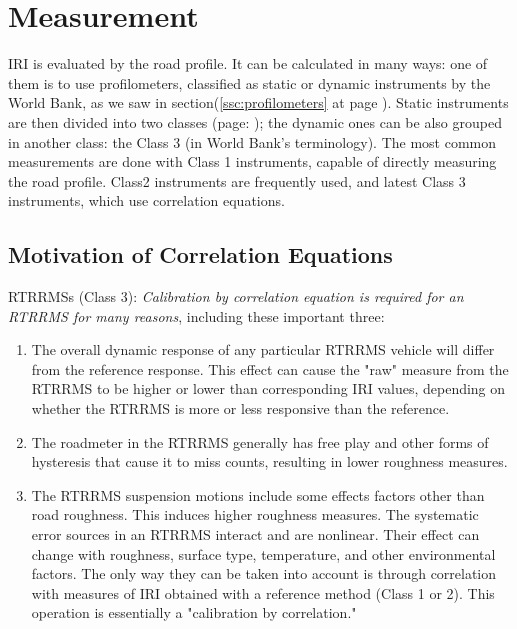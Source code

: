 \documentclass[tesi]{subfiles}
\begin{document}
\section{Measurement}\label{Measurement of IRI}
IRI is evaluated by the road profile. It can be calculated in many ways: one of them is to use profilometers, classified as static or dynamic instruments by the World Bank, as we saw in section(\ref{ssc:profilometers} at page \pageref{ssc:profilometers}). Static instruments are then divided into two classes (page: \pageref{ssc:Instrument_Contact}); the dynamic ones can be also grouped in another class: the Class 3 (in World Bank's terminology).
The most common measurements are done with Class 1 instruments, capable of directly measuring the road profile. Class2 instruments are frequently used, and latest Class 3 instruments, which use correlation equations.

\subsection{Motivation of Correlation Equations}\label{ssc:correlation}
RTRRMSs (Class 3):  \textit{Calibration by correlation equation is required for an RTRRMS for many reasons}, including these important three\cite{little_book}:
\begin{enumerate}
\item The overall dynamic response of any particular RTRRMS vehicle will differ from the reference response. This effect can cause the "raw" measure from the RTRRMS to be higher or lower than corresponding IRI values, depending on whether the RTRRMS is more or less responsive than the reference.

\item The roadmeter in the RTRRMS generally has free play and other forms of hysteresis that cause it to miss counts, resulting in lower roughness measures.

\item The RTRRMS suspension motions include some effects factors other than road roughness. This induces higher roughness measures. The systematic error sources in an RTRRMS interact and are nonlinear. Their effect can change with roughness, surface type, temperature, and other environmental factors. The only way they can be taken into account is through correlation with measures of IRI obtained with a reference method (Class 1 or 2). This operation is essentially a "calibration by correlation."

\end{enumerate}
\end{document}
